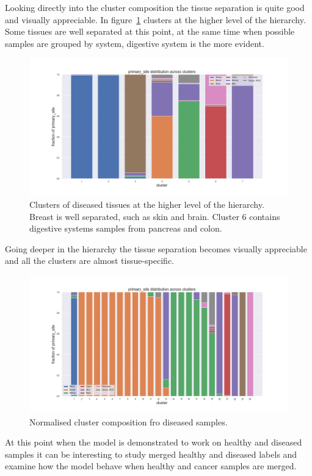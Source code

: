 Looking directly into the cluster composition the tissue separation is quite good and visually appreciable. In figure~\ref{fig:topic/tcga/fraction_clustercomposition_l4_primary_site} clusters at the higher level of the hierarchy. Some tissues are well separated at this point, at the same time when possible samples are grouped by system, digestive system is the more evident.
\begin{figure}[htb!]
	\centering
	\includegraphics[width=0.8\linewidth]{pictures/topic/tcga/fraction_clustercomposition_l4_primary_site.png}
	\caption{Clusters of diseased tissues at the higher level of the hierarchy. Breast is well separated, such as skin and brain. Cluster 6 contains digestive systems samples from pancreas and colon.}
	\label{fig:topic/tcga/fraction_clustercomposition_l4_primary_site}
\end{figure}
Going deeper in the hierarchy the tissue separation becomes visually appreciable and all the clusters are almost tissue-specific.
\begin{figure}[htb!]
	\centering
	\includegraphics[width=0.8\linewidth]{pictures/topic/tcga/fraction_clustercomposition_l3_primary_site.png}
	\caption{Normalised cluster composition fro diseased samples.}
	\label{fig:topic/tcga/fraction_clustercomposition_l3_primary_site}
\end{figure}

At this point when the model is demonstrated to work on healthy and diseased samples it can be interesting to study merged healthy and diseased labels and examine how the model behave when healthy and cancer samples are merged.
